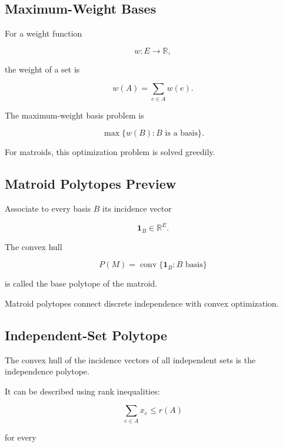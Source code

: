 \subsection{Maximum-Weight Bases}
\label{subsec:maximum-weight-bases}

For a weight function

\[
w:E\to\mathbb{R},
\]

the weight of a set is

\[
\boxed{
w(A)
=
\sum_{e\in A}w(e).
}
\]

The maximum-weight basis problem is

\[
\boxed{
\max
\{
w(B):
B\text{ is a basis}
\}.
}
\]

For matroids, this optimization problem is solved greedily.

\subsection{Matroid Polytopes Preview}
\label{subsec:matroid-polytopes-preview}

Associate to every basis \(B\) its incidence vector

\[
\mathbf{1}_B\in\mathbb{R}^{E}.
\]

The convex hull

\[
\boxed{
P(M)
=
\operatorname{conv}
\{
\mathbf{1}_B:
B\text{ basis}
\}
}
\]

is called the base polytope of the matroid.

Matroid polytopes connect discrete independence with convex
optimization.

\subsection{Independent-Set Polytope}
\label{subsec:independent-set-polytope}

The convex hull of the incidence vectors of all independent sets is the
independence polytope.

It can be described using rank inequalities:

\[
\boxed{
\sum_{e\in A}x_e
\leq
r(A)
}
\]

for every


